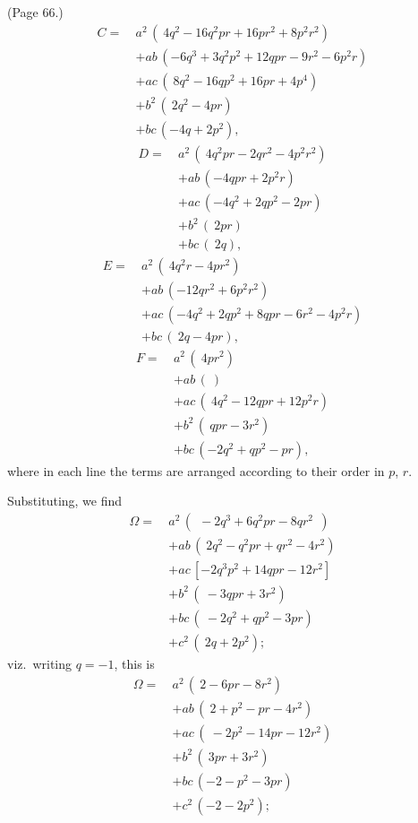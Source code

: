 \documentclass[11pt,a4paper]{article}
\begin{document}
\bigskip

\noindent (Page 66.)
\begin{align*}
C = \ & a^2\,(\ 4q^2 - 16q^2 pr + 16pr^2 + 8p^2 r^2) \\
& + ab\,(-6q^3 + 3q^2 p^2 + 12qpr - 9r^2 - 6p^2 r) \\
& + ac\,(\ 8q^2 - 16qp^2 + 16pr + 4p^4) \\
& + b^2\,(\ 2q^2 - 4pr) \\
& + bc\,(-4q + 2p^2),
\end{align*}
\begin{align*}
D = \ & a^2\,(\ 4q^2 pr - 2qr^2 - 4p^2 r^2) \\
& + ab\,(-4qpr + 2p^2 r) \\
& + ac\,(-4q^2 + 2qp^2 - 2pr) \\
& + b^2\,(\ 2pr) \\
& + bc\,(\ 2q),
\end{align*}
\begin{align*}
E = \ & a^2\,(\ 4q^2 r - 4pr^2) \\
& + ab\,(-12qr^2 + 6p^2 r^2) \\
& + ac\,(-4q^2 + 2qp^2 + 8qpr - 6r^2 - 4p^2 r) \\
& + bc\,(\ 2q - 4pr),
\end{align*}
\begin{align*}
F = \ & a^2\,(\ 4pr^2) \\
& + ab\,(\ ) \\
& + ac\,(\ 4q^2 - 12qpr + 12p^2 r) \\
& + b^2\,(\ qpr - 3r^2) \\
& + bc\,(-2q^2 + qp^2 - pr),
\end{align*}
where in each line the terms are arranged according to their order in $p$, $r$.

Substituting, we find
\begin{align*}
\Omega = \ & a^2\,(\ \ -2q^3 + 6q^2 pr - 8q r^2\ \ ) \\
& + ab\,(\ 2q^2 - q^2 pr + qr^2 - 4r^2) \\
& + ac\,[-2q^3 p^2 + 14qpr - 12r^2] \\
& + b^2\,(\ -3qpr + 3r^2) \\
& + bc\,(\ -2q^2 + qp^2 - 3pr) \\
& + c^2\,(\ 2q + 2p^2);
\end{align*}
viz.\ writing $q = -1$, this is
\begin{align*}
\Omega = \ & a^2\,(\ 2 - 6pr - 8r^2) \\
& + ab\,(\ 2 + p^2 - pr - 4r^2) \\
& + ac\,(\ -2p^2 - 14pr - 12r^2) \\
& + b^2\,(\ 3pr + 3r^2) \\
& + bc\,(-2 - p^2 - 3pr) \\
& + c^2\,(-2 - 2p^2);
\end{align*}
\end{document}
